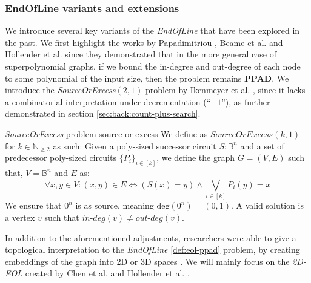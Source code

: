 \subsubsection{EndOfLine variants and extensions}
\label{sec:mc-variants}

We introduce several key variants of the \textit{EndOfLine} that have been explored in the past.
We first highlight the
works by Papadimitriou \cite{papadimitriou_GraphtheoreticLemmataComplexity_1990},
Beame et al. \cite{beame_RelativeComplexityNP_1998} and
Hollender et al. \cite{hollender_ComplexityMultisourceVariants_2018} since they demonstrated that in the more general case of superpolynomial graphs,
if we bound the in-degree and out-degree of each node to some polynomial of the input size, then the problem remains \textbf{PPAD}.
We introduce the \textit{SourceOrExcess}$(2,1)$ problem by Ikenmeyer et al. \cite{ikenmeyer_WhatWhatNot_2022}, since it
lacks a combinatorial interpretation under decrementation (``$-1$''), as further demonstrated in section \ref{sec:back:count-plus-search}.

\begin{definitionbox}{\textit{SourceOrExcess} problem \cite{ikenmeyer_WhatWhatNot_2022}}{source-or-excess}
    We define as $\textit{SourceOrExcess}(k,1)$ for $k \in \mathbb{N}_{\geq 2}$ as such:
    Given a poly-sized successor circuit $S : \mathbb{B}^n$
    and a set of predecessor poly-sized circuits $\{P_i\}_{i \in [k]}$, we define
    the graph $G = (V,E)$ such that, $V = \mathbb{B}^n$ and $E$ as:
    $$
        \forall x, y \in V: (x,y) \in E \iff (S(x) = y) \wedge \bigvee_{i \in [k]} P_i(y) = x
    $$
    We ensure that $0^n$ is as source, meaning $\text{deg}(0^n) = (0,1)$.
    A valid solution is a vertex $v$ such that $\textit{in-deg}(v) \neq \textit{out-deg}(v)$.
\end{definitionbox}


In addition to the aforementioned adjustments, researchers were able to give a topological interpretation
to the \textit{EndOfLine} \ref{def:eol-ppad} problem, by creating embeddings of the graph
into 2D or 3D spaces \cite{chen_Complexity2DDiscrete_2009, hollender_ComplexityMultisourceVariants_2018,daskalakis_ComplexityComputingNash_2006}.
We will mainly focus on the \textit{2D-EOL}
created by Chen et al. \cite{chen_Complexity2DDiscrete_2009} and Hollender et al. \cite{hollender_ComplexityMultisourceVariants_2018}.

